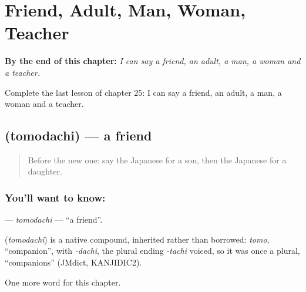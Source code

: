 
\chapter{Friend, Adult, Man, Woman, Teacher}
\label{ch:ja-friend-adult-man-woman-teacher}

\begin{chapteropening}
\textbf{By the end of this chapter:} \emph{I can say a friend, an adult, a man, a woman and a teacher.}

Complete the last lesson of chapter 25: I can say a friend, an adult, a man, a woman and a teacher.
\end{chapteropening}

\section[\texorpdfstring{\ja{ともだち} (tomodachi)}{ともだち (tomodachi)}]{ (tomodachi) — a friend}

\label{lesson:JA-C25-tomodachi}



\begin{quote}
Before the new one: say the Japanese for a son, then the Japanese for a daughter.
\end{quote}

\subsection*{You'll want to know: }
\textbf{} — \emph{tomodachi} — \textquotedblleft{}a friend\textquotedblright{}.

\begin{cousinweb}
\textbf{} (\emph{tomodachi}) is a native compound, inherited rather than borrowed: \emph{tomo}, \textquotedblleft{}companion\textquotedblright{}, with \emph{-dachi}, the plural ending \emph{-tachi} voiced, so it was once a plural, \textquotedblleft{}companions\textquotedblright{} (JMdict, KANJIDIC2).
\end{cousinweb}

\begin{grammarlens}[title={What you've built}]
One more word for this chapter.
\end{grammarlens}

